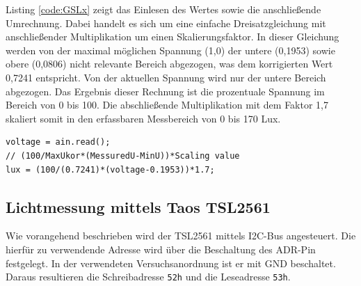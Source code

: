 \documentclass[a4paper,12pt]{scrartcl}
\begin{document}
Listing \ref{code:GSLx} zeigt das Einlesen des Wertes sowie die anschließende Umrechnung. Dabei handelt es sich um eine einfache Dreisatzgleichung mit anschließender Multiplikation um einen Skalierungsfaktor. In dieser Gleichung werden von der maximal möglichen Spannung (1,0) der untere (0,1953) sowie obere (0,0806) nicht relevante Bereich abgezogen, was dem korrigierten Wert 0,7241 entspricht. Von der aktuellen Spannung wird nur der untere Bereich abgezogen. Das Ergebnis dieser Rechnung ist die prozentuale Spannung im Bereich von 0 bis 100. Die abschließende Multiplikation mit dem Faktor 1,7 skaliert somit in den erfassbaren Messbereich von 0 bis 170 Lux.


\begin{lstlisting}[captionpos=b, caption=Berechnung der Beleuchtungsstärke mit dem GSLx, label=code:GSLx]
voltage = ain.read();
// (100/MaxUkor*(MessuredU-MinU))*Scaling value
lux = (100/(0.7241)*(voltage-0.1953))*1.7;
\end{lstlisting}

\subsection{Lichtmessung mittels Taos TSL2561}
\label{sec:impTaos}
Wie vorangehend beschrieben wird der TSL2561 mittels I2C-Bus angesteuert. Die hierfür zu verwendende Adresse wird über die Beschaltung des ADR-Pin festgelegt. In der verwendeten Versuchsanordnung ist er mit GND beschaltet. Daraus resultieren die Schreibadresse \texttt{52h} und die Leseadresse \texttt{53h}.
\end{document}
